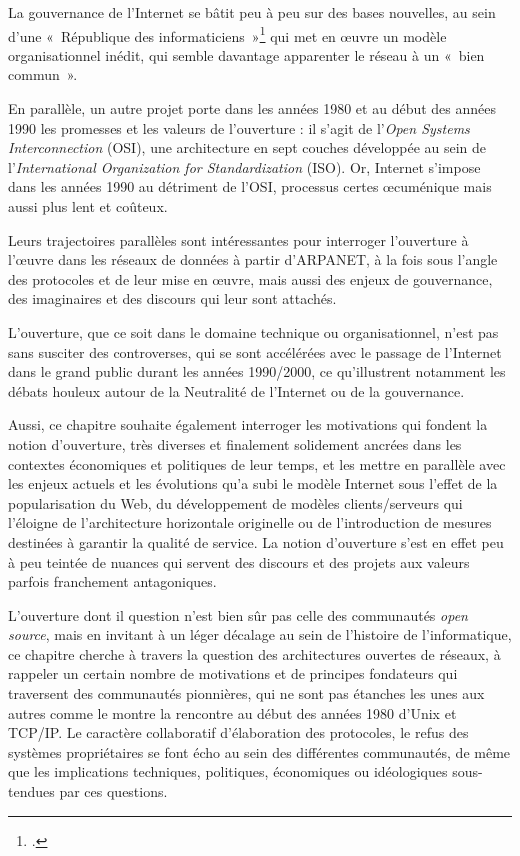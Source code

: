 \documentclass{FramateX}
\begin{document}
\begin{refsection}
La gouvernance de l'Internet se bâtit peu à peu sur des
bases nouvelles, au sein d'une «~République des
informaticiens~»\footnote{\cite[p.~90]{flichyinternet1999}.} qui met en œuvre un modèle organisationnel inédit, qui
semble davantage apparenter le réseau à un «~bien commun~». 

En parallèle, un autre projet porte dans les années 1980 et au début des
années 1990 les promesses et les valeurs de
l'ouverture : il s'agit de
l'\textit{Open Systems Interconnection} (OSI), une
architecture en sept couches développée au sein de
l'\textit{International Organization for
Standardization} (ISO). Or, Internet s'impose dans les
années 1990 au détriment de l'OSI, processus certes
œcuménique mais aussi plus lent et coûteux. 

Leurs trajectoires parallèles sont intéressantes pour interroger
l'ouverture à l'œuvre dans les
réseaux de données à partir d'ARPANET, à la fois sous l'angle des protocoles et de leur mise
en œuvre, mais aussi des enjeux de gouvernance, des imaginaires et des discours qui leur sont attachés.

L'ouverture, que ce soit dans le domaine technique ou
organisationnel, n'est pas sans susciter des
controverses, qui se sont accélérées avec le passage de
l'Internet dans le grand public durant les années
1990/2000, ce qu'illustrent notamment les débats
houleux autour de la Neutralité de l'Internet ou de la
gouvernance.

Aussi, ce chapitre souhaite également interroger les motivations qui
fondent la notion d'ouverture, très diverses et
finalement solidement ancrées dans les contextes économiques et
politiques de leur temps, et les mettre en parallèle avec les enjeux
actuels et les évolutions qu'a subi le modèle Internet
sous l'effet de la popularisation du Web, du
développement de modèles clients/serveurs qui
l'éloigne de l'architecture
horizontale originelle ou de l'introduction de mesures
destinées à garantir la qualité de service. La notion
d'ouverture s'est en effet peu à peu
teintée de nuances qui servent des discours et des projets aux valeurs
parfois franchement antagoniques. 

L'ouverture dont il question n'est
bien sûr pas celle des communautés \textit{open source}, mais en invitant à
un léger décalage au sein de l'histoire de
l'informatique, ce chapitre cherche à travers la
question des architectures ouvertes de réseaux, à rappeler un certain
nombre de motivations et de principes fondateurs qui traversent des
communautés pionnières, qui ne sont pas étanches les unes aux autres
comme le montre la rencontre au début des années 1980
d'Unix et TCP/IP. Le caractère collaboratif
d'élaboration des protocoles, le refus des systèmes
propriétaires se font écho au sein des différentes communautés, de même
que les implications techniques, politiques, économiques ou
idéologiques sous-tendues par ces questions. 


\end{refsection}
\end{document}
